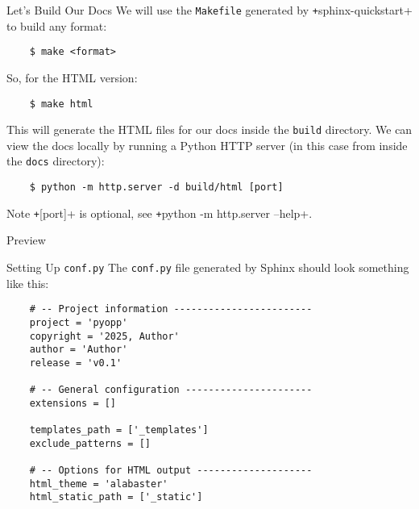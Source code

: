 \begin{frame}[fragile]{Let's Build Our Docs}
  We will use the \texttt{Makefile} generated by \texttt+sphinx-quickstart+ to build any format:
  \begin{verbatim}
    $ make <format>
  \end{verbatim}
  So, for the HTML version:
  \begin{verbatim}
    $ make html
  \end{verbatim}
  This will generate the HTML files for our docs inside the \texttt{build} directory.
  We can view the docs locally by running a Python HTTP server (in this case from inside the \texttt{docs} directory):
  \begin{verbatim}
    $ python -m http.server -d build/html [port]
  \end{verbatim}

  \begin{block}{Note}
    \texttt+[port]+ is optional, see \texttt+python -m http.server --help+.
  \end{block}
\end{frame}


\begin{frame}[fragile]{Preview}
\end{frame}

\begin{frame}[fragile]{Setting Up \texttt{conf.py}}
  The \texttt{conf.py} file generated by Sphinx should look something like this:
  \begin{verbatim}
    # -- Project information ------------------------
    project = 'pyopp'
    copyright = '2025, Author'
    author = 'Author'
    release = 'v0.1'

    # -- General configuration ----------------------
    extensions = []

    templates_path = ['_templates']
    exclude_patterns = []

    # -- Options for HTML output --------------------
    html_theme = 'alabaster'
    html_static_path = ['_static']
  \end{verbatim}
\end{frame}

